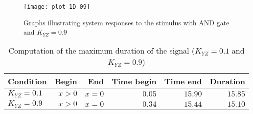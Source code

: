 \begin{figure}[h!]
 \centering
    \texttt{[image: plot\_1D\_09]} 
    \caption{Graphs illustrating system responses to the stimulus with AND
    gate and $K_{YZ} = 0.9 $}
	\label{fig:plot_1D_09}
\end{figure}

\begin{table}[h!]
\begin{center}
\begin{tabular}{|l|rr|rr|r|}
\hline
Condition & Begin & End & Time begin & Time end & Duration \\
\hline
$K_{YZ} = 0.1$ & $x>0$ & $x=0$ & $0.05$ & $15.90$ & $15.85$\\ 
$K_{YZ} = 0.9$ & $x>0$ & $x=0$ & $0.34$ & $15.44$ & $15.10$\\ 
\hline
\bottomrule
\end{tabular}
\caption{Computation of the maximum duration of the signal ($K_{YZ} = 0.1$ and
$K_{YZ} = 0.9$)}
\end{center}
\end{table}	


\newpage

\setcounter{chapter}{4}
\setcounter{section}{0}

% 
% 
% 
% 
% 
